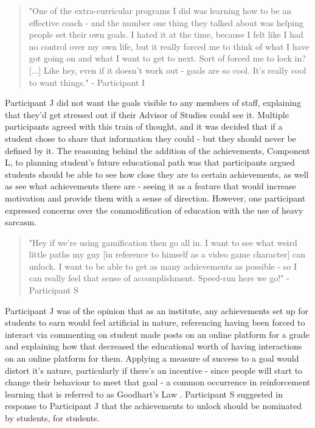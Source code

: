 \documentclass{l4proj}
\begin{document}
\begin{quote}
    "One of the extra-curricular programs I did was learning how to be an effective coach - and the number one thing they talked about was helping people set their own goals. I hated it at the time, because I felt like I had no control over my own life, but it really forced me to think of what I have got going on and what I want to get to next. Sort of forced me to lock in? [...] Like hey, even if it doesn't work out - goals are so cool. It's really cool to want things." - Participant I
\end{quote}

Participant J did not want the goals visible to any members of staff, explaining that they'd get stressed out if their Advisor of Studies could see it. Multiple participants agreed with this train of thought, and it was decided that if a student chose to share that information they could - but they should never be defined by it. The reasoning behind the addition of the achievements, Component L, to planning student's future educational path was that participants argued students should be able to see how close they are to certain achievements, as well as see what achievements there are - seeing it as a feature that would increase motivation and provide them with a sense of direction. However, one participant expressed concerns over the commodification of education with the use of heavy sarcasm. 

\begin{quote}
    "Hey if we're using gamification then go all in. I want to see what weird little paths my guy [in reference to himself as a video game character] can unlock. I want to be able to get as many achievements as possible - so I can really feel that sense of accomplishment. Speed-run here we go!" - Participant S
\end{quote}

Participant J was of the opinion that as an institute, any achievements set up for students to earn would feel artificial in nature, referencing having been forced to interact via commenting on student made posts on an online platform for a grade and explaining how that decreased the educational worth of having interactions on an online platform for them. Applying a measure of success to a goal would distort it's nature, particularly if there's an incentive - since people will start to change their behaviour to meet that goal - a common occurrence in reinforcement learning that is referred to as Goodhart's Law \citep{elton2004goodhart}. Participant S suggested in response to Participant J that the achievements to unlock should be nominated by students, for students. 
\end{document}

